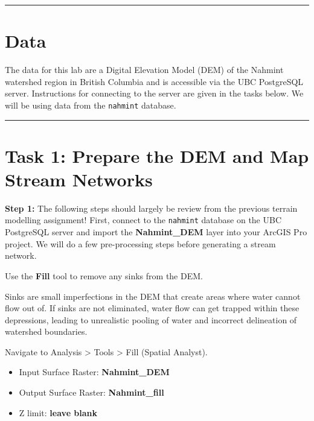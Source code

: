 \documentclass[
]{book}
\providecommand{\tightlist}{%
  \setlength{\itemsep}{0pt}\setlength{\parskip}{0pt}}
\begin{document}
\begin{center}\rule{0.5\linewidth}{0.5pt}\end{center}

\hypertarget{data-2}{%
\section*{Data}\label{data-2}}

The data for this lab are a Digital Elevation Model (DEM) of the Nahmint watershed region in British Columbia and is accessible via the UBC PostgreSQL server. Instructions for connecting to the server are given in the tasks below. We will be using data from the \texttt{nahmint} database.

\begin{center}\rule{0.5\linewidth}{0.5pt}\end{center}

\hypertarget{task-1-prepare-the-dem-and-map-stream-networks}{%
\section{Task 1: Prepare the DEM and Map Stream Networks}\label{task-1-prepare-the-dem-and-map-stream-networks}}

\textbf{Step 1:} The following steps should largely be review from the previous terrain modelling assignment! First, connect to the \texttt{nahmint} database on the UBC PostgreSQL server and import the \textbf{Nahmint\_DEM} layer into your ArcGIS Pro project. We will do a few pre-processing steps before generating a stream network.

Use the \textbf{Fill} tool to remove any sinks from the DEM.

Sinks are small imperfections in the DEM that create areas where water cannot flow out of. If sinks are not eliminated, water flow can get trapped within these depressions, leading to unrealistic pooling of water and incorrect delineation of watershed boundaries.

Navigate to Analysis \textgreater{} Tools \textgreater{} Fill (Spatial Analyst).

\begin{itemize}
\tightlist
\item
  Input Surface Raster: \textbf{Nahmint\_DEM}
\item
  Output Surface Raster: \textbf{Nahmint\_fill}
\item
  Z limit: \textbf{leave blank}
\end{itemize}
\end{document}

